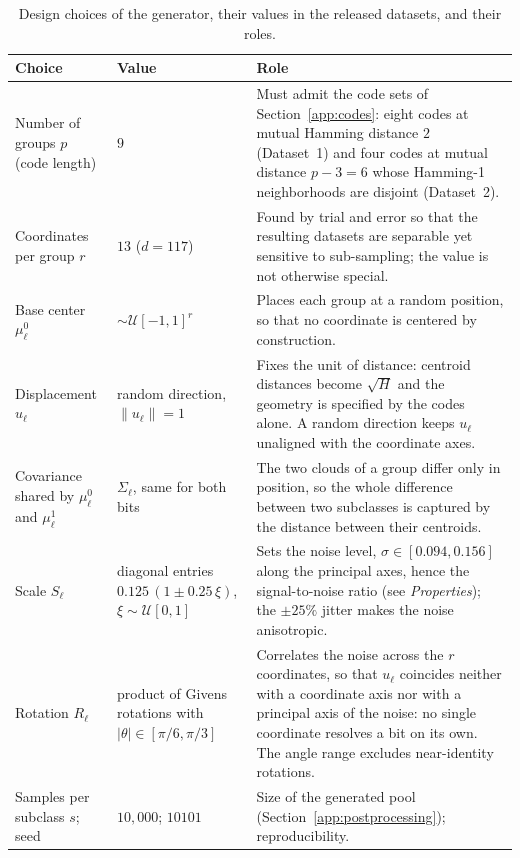 \documentclass[../ppgc-tese.tex]{subfiles}
\begin{document}
\begin{table}[ht]
    \centering
    \caption{Design choices of the generator, their values in the released datasets, and their roles.}
    \label{tab:design-choices}
    \small
    \begin{tabular}{>{\raggedright\arraybackslash}p{}>{\raggedright\arraybackslash}p{}>{\raggedright\arraybackslash}p{}}
        \toprule
        Choice & Value & Role \\
        \midrule
        Number of groups $p$ (code length) & $9$ & Must admit the code sets of Section~\ref{app:codes}: eight codes at mutual Hamming distance $2$ (Dataset~1) and four codes at mutual distance $p - 3 = 6$ whose Hamming-1 neighborhoods are disjoint (Dataset~2). \\
        Coordinates per group $r$ & $13$ ($d = 117$) & Found by trial and error so that the resulting datasets are separable yet sensitive to sub-sampling; the value is not otherwise special. \\
        Base center $\mu_\ell^0$ & $\sim \mathcal{U}[-1,1]^r$ & Places each group at a random position, so that no coordinate is centered by construction. \\
        Displacement $u_\ell$ & random direction, $\|u_\ell\| = 1$ & Fixes the unit of distance: centroid distances become $\sqrt{H}$ and the geometry is specified by the codes alone. A random direction keeps $u_\ell$ unaligned with the coordinate axes. \\
        Covariance shared by $\mu_\ell^0$ and $\mu_\ell^1$ & $\Sigma_\ell$, same for both bits & The two clouds of a group differ only in position, so the whole difference between two subclasses is captured by the distance between their centroids. \\
        Scale $S_\ell$ & diagonal entries $0.125\,(1 \pm 0.25\,\xi)$, $\xi \sim \mathcal{U}[0,1]$ & Sets the noise level, $\sigma \in [0.094, 0.156]$ along the principal axes, hence the signal-to-noise ratio (see \emph{Properties}); the $\pm 25\%$ jitter makes the noise anisotropic. \\
        Rotation $R_\ell$ & product of Givens rotations with $|\theta| \in [\pi/6, \pi/3]$ & Correlates the noise across the $r$ coordinates, so that $u_\ell$ coincides neither with a coordinate axis nor with a principal axis of the noise: no single coordinate resolves a bit on its own. The angle range excludes near-identity rotations. \\
        Samples per subclass $s$; seed & $10{,}000$; $10101$ & Size of the generated pool (Section~\ref{app:postprocessing}); reproducibility. \\
        \bottomrule
    \end{tabular}
\end{table}
\end{document}

